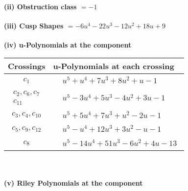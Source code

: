 \documentclass[1p]{elsarticle_modified}
\theoremstyle{definition}
\begin{document}
\flushleft \textbf{(ii) Obstruction class $= -1$}\\~\\
\flushleft \textbf{(iii) Cusp Shapes $= -6 u^4-22 u^3-12 u^2+18 u+9$}\\~\\
\newpage\renewcommand{\arraystretch}{1}
\flushleft \textbf{(iv) u-Polynomials at the component}\newline \\
\begin{tabular}{m{50pt}|m{274pt}}
Crossings & \hspace{64pt}u-Polynomials at each crossing \\
\hline $$\begin{aligned}c_{1}\end{aligned}$$&$\begin{aligned}
&u^5+u^4+7 u^3+8 u^2+u-1
\end{aligned}$\\
\hline $$\begin{aligned}c_{2},c_{6},c_{7}\\c_{11}\end{aligned}$$&$\begin{aligned}
&u^5-3 u^4+5 u^3-4 u^2+3 u-1
\end{aligned}$\\
\hline $$\begin{aligned}c_{3},c_{4},c_{10}\end{aligned}$$&$\begin{aligned}
&u^5+5 u^4+7 u^3+u^2-2 u-1
\end{aligned}$\\
\hline $$\begin{aligned}c_{5},c_{9},c_{12}\end{aligned}$$&$\begin{aligned}
&u^5- u^4+12 u^3+3 u^2- u-1
\end{aligned}$\\
\hline $$\begin{aligned}c_{8}\end{aligned}$$&$\begin{aligned}
&u^5-14 u^4+51 u^3-6 u^2+4 u-13
\end{aligned}$\\
\hline
\end{tabular}\\~\\
\newpage\renewcommand{\arraystretch}{1}
\flushleft \textbf{(v) Riley Polynomials at the component}\newline \\
\end{document}
